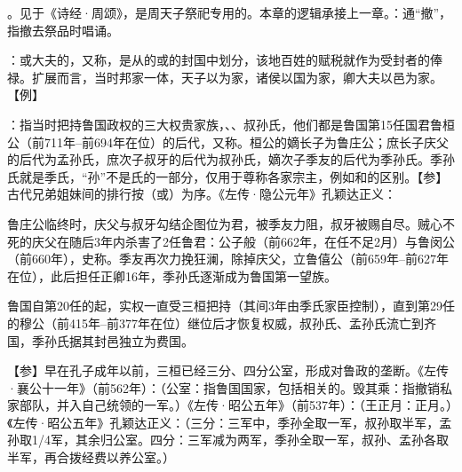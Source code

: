 {
\item {}。见于《诗经·周颂》，是周天子祭祀专用的。本章的逻辑承接上一章。：通“撤”，指撤去祭品时唱诵。

：或大夫的，又称，是从的或的封国中划分，该地百姓的赋税就作为受封者的俸禄。扩展而言，当时邦家一体，天子以为家，诸侯以国为家，卿大夫以邑为家。【例】 

：指当时把持鲁国政权的三大权贵家族，、、叔孙氏，他们都是鲁国第15任国君鲁桓公（前711年--前694年在位）的后代，又称。桓公的嫡长子为鲁庄公；庶长子庆父的后代为孟孙氏，庶次子叔牙的后代为叔孙氏，嫡次子季友的后代为季孙氏。季孙氏就是季氏，“孙”不是氏的一部分，仅用于尊称各家宗主，例如和的区别。【参】古代兄弟姐妹间的排行按（或）为序。《左传·隐公元年》孔颖达正义：

鲁庄公临终时，庆父与叔牙勾结企图位为君，被季友力阻，叔牙被赐自尽。贼心不死的庆父在随后3年内杀害了2任鲁君：公子般（前662年，在任不足2月）与鲁闵公（前660年），史称。季友再次力挽狂澜，除掉庆父，立鲁僖公（前659年--前627年在位），此后担任正卿16年，季孙氏逐渐成为鲁国第一望族。

鲁国自第20任的起，实权一直受三桓把持（其间3年由季氏家臣控制），直到第29任的穆公（前415年--前377年在位）继位后才恢复权威，叔孙氏、孟孙氏流亡到齐国，季孙氏据其封邑独立为费国。%

【参】早在孔子成年以前，三桓已经三分、四分公室，形成对鲁政的垄断。《左传·襄公十一年》（前562年）：（公室：指鲁国国家，包括相关的。毁其乘：指撤销私家部队，并入自己统领的一军。）《左传·昭公五年》（前537年）：（王正月：正月。）《左传·昭公五年》孔颖达正义：（三分：三军中，季孙全取一军，叔孙取半军，孟孙取1/4军，其余归公室。四分：三军减为两军，季孙全取一军，叔孙、孟孙各取半军，再合拨经费以养公室。）

}
